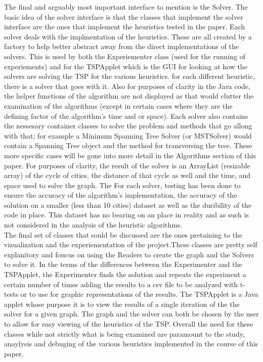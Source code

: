 \documentclass[midd]{thesis}
\newcommand{\tab}{\hspace*{2em}}
\begin{document}
\tab The final and arguably most important interface to mention is the Solver. The basic idea of the solver interface is that the classes that implement the solver interface are the ones that implement the heuristics tested in the paper. Each solver deals with the implmentation of the heuristics. These are all created by a factory to help better abstract away from the direct implementations of the solvers. This is used by both the Experiementer class (used for the running of experiements) and for the TSPApplet which is the GUI for looking at how the solvers are solving the TSP for the various heuristics. for each different heuristic, there is a solver that goes with it. Also for purposes of clarity in the Java code, the helper functions of the algorithm are not displayed as that would clutter the examination of the algorithms (except in certain cases where they are the defining factor of the algorithm's time and or space). Each solver also contains the nessesary container classes to solve the problem and methods that go allong with that; for example a Minimum Spanning Tree Solver (or MSTSolver) would contain a Spanning Tree object and the method for transversing the tree. These more specific cases will be gone into more detail in the Algorithms section of this paper. For purposes of clarity, the result of the solver is an ArrayList (resizable array) of the cycle of cities, the distance of that cycle as well and the time, and space used to solve the graph. The For each solver, testing has been done to ensure the accuracy of the algorithm's implementation, the accuracy of the solution on a smaller (less than 10 cities) dataset as well as the duribility of the code in place. This dataset has no bearing on an place in reality and as such is not considered in the analysis of the heuristic algorithms.\\
\tab The final set of classes that sould be discussed are the ones pretaining to the vizualization and the experiementation of the project.These classes are pretty self explanitory and foucus on using the Readers to create the graph and the Solvers to solve it. In the terms of the differences between the Experimenter and the TSPApplet, the Experimenter finds the solution and repeats the experiment a certain number of times adding the results to a csv file to be analyzed with t-tests or to use for graphic representations of the results. The TSPApplet is a Java applet whose purpose it is to view the results of a single iteration of the the solver for a given graph. The graph and the solver can both be chosen by the user to allow for easy viewing of the heuristics of the TSP. Overall the need for these classes while not strictly what is being examined are paramount to the study, anaylysis and debuging of the various heuristics implemented in the course of this paper.\\
\end{document}
